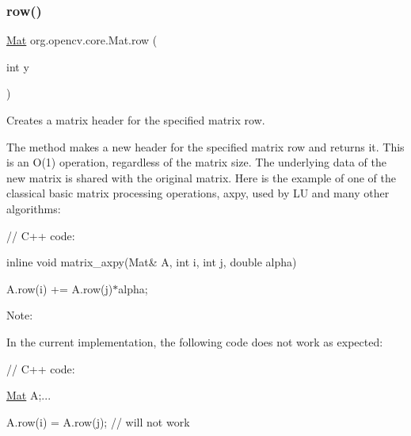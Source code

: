 \subsubsection{\texorpdfstring{row()}{row()}}
{\footnotesize\ttfamily \mbox{\hyperlink{classorg_1_1opencv_1_1core_1_1_mat}{Mat}} org.\+opencv.\+core.\+Mat.\+row (\begin{DoxyParamCaption}\item[{int}]{y }\end{DoxyParamCaption})}

Creates a matrix header for the specified matrix row.

The method makes a new header for the specified matrix row and returns it. This is an O(1) operation, regardless of the matrix size. The underlying data of the new matrix is shared with the original matrix. Here is the example of one of the classical basic matrix processing operations, {\ttfamily axpy}, used by LU and many other algorithms\+: {\ttfamily }

{\ttfamily }

{\ttfamily }

{\ttfamily // C++ code\+:}

{\ttfamily }

{\ttfamily }

{\ttfamily inline void matrix\+\_\+axpy(\+Mat\& A, int i, int j, double alpha)}

{\ttfamily }

{\ttfamily }

{\ttfamily A.\+row(i) += A.\+row(j)$\ast$alpha;}

{\ttfamily }

{\ttfamily }

{\ttfamily Note\+: }

In the current implementation, the following code does not work as expected\+: {\ttfamily }

{\ttfamily }

{\ttfamily }

{\ttfamily // C++ code\+:}

{\ttfamily }

{\ttfamily }

{\ttfamily \mbox{\hyperlink{classorg_1_1opencv_1_1core_1_1_mat}{Mat}} A;...}

{\ttfamily }

{\ttfamily }

{\ttfamily A.\+row(i) = A.\+row(j); // will not work}

{\ttfamily }

